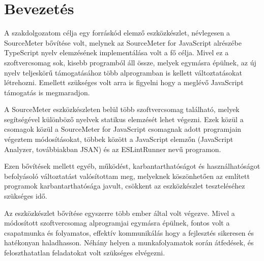 \chapter{Bevezetés}
\label{chap:intro}

\noindent 
A szakdolgozatom célja egy forráskód elemző eszközkészlet, névlegesen a SourceMeter bővítése volt, melynek az SourceMeter for JavaScript alrészébe TypeScript \cite{nance2014typescript}\cite{fenton2017pro}\cite{cherny2019programming}\cite{10.1007/978-3-662-44202-9_11} nyelv elemzésének implementálása volt a fő célja.
Mivel ez a szoftvercsomag sok, kisebb programból áll össze, melyek egymásra épülnek, az új nyelv teljeskörű támogatásához több alprogramban is kellett változtatásokat létrehozni. Emellett szükséges volt arra is figyelni hogy a meglévő JavaScript támogatás is megmaradjon.

A SourceMeter eszközkészleten belül több szoftvercsomag található, melyek segítségével különböző nyelvek statikus elemzését lehet végezni. Ezek közül a csomagok közül a SourceMeter for JavaScript csomagnak adott programjain végeztem módosításokat, többek között a JavaScript elemzőn (JavaScript Analyzer, továbbiakban JSAN) és az ESLintRunner nevű programon. 

Ezen bővítések mellett egyéb, működést, karbantarthatóságot és használhatóságot befolyásoló változtatást valósítottam meg, melyeknek köszönhetően az említett programok karbantarthatósága javult, csökkent az eszközkészlet teszteléséhez szükséges idő.

Az eszközkészlet bővítése egyszerre több ember által volt végezve. Mivel a módosított szoftvercsomag alprogramjai egymásra épülnek, fontos volt a csapatmunka és folyamatos, effektív kommunikálás hogy a fejlesztés sikeresen és hatékonyan haladhasson. Néhány helyen a munkafolyamatok során átfedések, és feloszthatatlan feladatokat volt szükséges elvégezni. 